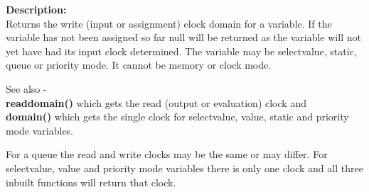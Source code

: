        {\bf Description:} \\
        Returns the write (input or assignment) clock domain for a variable. If
        the variable has not been assigned so far null will be returned as the
        variable will not yet have had its input clock determined. The
        variable may be selectvalue, static, queue or priority mode.
        It cannot be memory or clock mode.
        
        See also - \\
        {\bf readdomain()}  which gets the read
        (output or evaluation) clock and \\
        {\bf domain()}  which
        gets the single clock for selectvalue, value, static and priority mode
        variables.
        
        For a queue the read and write clocks may be the same or may differ.
        For selectvalue, value and priority mode variables there is only
        one clock and all three inbuilt functions will return that clock.






